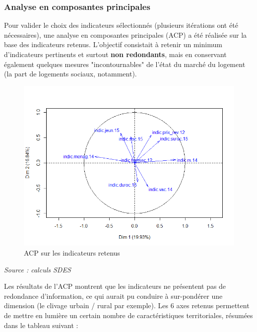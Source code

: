 \documentclass[12pt, a4paper]{article}
\begin{document}
\subsubsection{Analyse en composantes principales}

Pour valider le choix des indicateurs sélectionnés (plusieurs itérations ont été nécessaires), une analyse en composantes principales (ACP) a été réalisée sur la base des indicateurs retenus. L'objectif consistait à retenir un minimum d'indicateurs pertinents et surtout \textbf{non redondants}, mais en conservant également quelques mesures "incontournables" de l'état du marché du logement (la part de logements sociaux, notamment).


\begin{figure}[H]
\caption{ACP sur les indicateurs retenus}
\begin{center}
\includegraphics[scale=.7]{img/ACP.png}
\end{center}
\end{figure}
\emph{Source : calculs SDES}

Les résultats de l'ACP montrent que les indicateurs ne présentent pas de redondance d'information, ce qui aurait pu conduire à sur-pondérer une dimension (le clivage urbain / rural par exemple). Les 6 axes retenus permettent de mettre en lumière un certain nombre de caractéristiques territoriales, résumées dans le tableau suivant : \\
\end{document}
